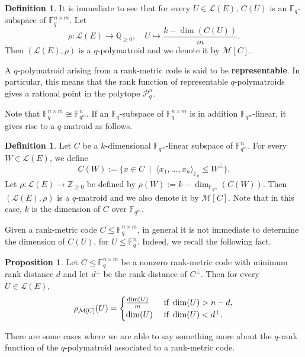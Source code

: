\documentclass[a4paper,11pt,reqno]{amsart}
\theoremstyle{definition}
\newtheorem{definition}[theorem]{{{Definition}}}
\newtheorem{proposition}[theorem]{{{Proposition}}}
\newcommand{\mM}{\mathcal{M}}
\newcommand{\mL}{\mathcal{L}}
\newcommand{\F}{\mathbb F}
\newcommand{\RP}{\mathcal{P}_q^n}
\begin{document}
{\begin{definition}
It is immediate to see that for every $U\in\mL(E)$, $C(U)$ is an $\F_q$-subspace of $\F_q^{n\times m}$.
Let 
$$\rho: \mL (E) \longrightarrow \mathbb{Q}_{\geq 0}, \quad U\longmapsto\frac{k-\dim(C(U))}{m}.$$
Then $(\mL(E),\rho)$ is a $q$-polymatroid \cite[Theorem 5.3]{gorla2019rank} and we denote it by $\mM[C]$.	
\end{definition}

A $q$-polymatroid arising from a rank-metric code is said to be \textbf{representable}. In particular, this means that the rank function of representable $q$-polymatroids gives a rational point in the polytope $\RP$. 

Note that $\F_q^{n\times m}\cong \F_{q^m}^n$. If an $\F_q$-subspace of $\F_q^{n\times m}$ is in addition $\F_{q^m}$-linear, it gives rise to a $q$-matroid as follows.
	
\begin{definition}\label{def:vector_codes}
Let $C$ be a $k$-dimensional $\mathbb{F}_{q^m}$-linear subspace of $\F_{q^m}^n$. For every $W \in\mL(E)$, we define
$$C(W):=\{x \in C \;\mid\; \langle x_1, \ldots, x_n\rangle_{\F_q} \leq W^\perp\}.$$ 
Let $\rho: \mL (E) \longrightarrow \mathbb{Z}_{\geq 0}$ be defined by
$\displaystyle \rho(W):=k-\dim_{\F_{q^m}}(C(W)).$
Then $(\mL(E),\rho)$ is a $q$-matroid \cite[Thm. 24]{jurrius2018defining} and we also denote it by $\mM[C]$. Note that in this case, $k$ is the dimension of $C$ over $\F_{q^m}$. 	
\end{definition}

Given a rank-metric code $C\leq \F_q^{n\times m}$, in general it is not immediate to determine the dimension of $C(U)$, for $U\leq\F_q^n$. Indeed, we recall the following fact.

\begin{proposition}\cite[Prop. 6.2]{gorla2019rank}
    Let $C\leq \F_q^{n\times m}$ be a nonzero rank-metric code with minimum rank distance $d$ and let $d^\perp$ be the rank distance of $C^\perp$. Then for every $U\in\mL(E)$, 
    $$\rho_{\mM[C]}(U) = 
    \begin{cases}
        \frac{\dim(U)}{m} & \textnormal{ if } \dim(U)> n-d, \\
        \dim(U) & \textnormal{ if } \dim(U)<d^\perp.
    \end{cases}$$
\end{proposition}

There are some cases where we are able to say something more about the $q$-rank function of the $q$-polymatroid associated to a rank-metric code. 


}
\end{document}
